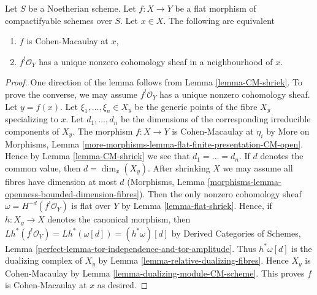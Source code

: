 \begin{lemma}
\label{lemma-affine-flat-Noetherian-CM}
Let $S$ be a Noetherian scheme. Let $f : X \to Y$ be a flat
morphism of compactifyable schemes over $S$. Let $x \in X$.
The following are equivalent
\begin{enumerate}
\item $f$ is Cohen-Macaulay at $x$,
\item $f^!\mathcal{O}_Y$ has a unique nonzero cohomology sheaf
in a neighbourhood of $x$.
\end{enumerate}
\end{lemma}

\begin{proof}
One direction of the lemma follows from Lemma \ref{lemma-CM-shriek}.
To prove the converse, we may assume $f^!\mathcal{O}_Y$ has a unique
nonzero cohomology sheaf. Let $y = f(x)$. Let $\xi_1, \ldots, \xi_n \in X_y$
be the generic points of the fibre $X_y$ specializing to $x$.
Let $d_1, \ldots, d_n$ be the dimensions of the corresponding
irreducible components of $X_y$. The morphism $f : X \to Y$ is Cohen-Macaulay
at $\eta_i$ by More on Morphisms, Lemma
\ref{more-morphisms-lemma-flat-finite-presentation-CM-open}.
Hence by Lemma \ref{lemma-CM-shriek} we see that
$d_1 = \ldots = d_n$. If $d$ denotes the common value, then $d = \dim_x(X_y)$.
After shrinking $X$ we may assume all fibres have dimension at most $d$
(Morphisms, Lemma \ref{morphisms-lemma-openness-bounded-dimension-fibres}).
Then the only nonzero cohomology sheaf $\omega = H^{-d}(f^!\mathcal{O}_Y)$
is flat over $Y$ by Lemma \ref{lemma-flat-shriek}.
Hence, if $h : X_y \to X$ denotes the canonical morphism, then
$Lh^*(f^!\mathcal{O}_Y) = Lh^*(\omega[d]) = (h^*\omega)[d]$
by Derived Categories of Schemes, Lemma
\ref{perfect-lemma-tor-independence-and-tor-amplitude}.
Thus $h^*\omega[d]$ is the dualizing complex of $X_y$ by
Lemma \ref{lemma-relative-dualizing-fibres}.
Hence $X_y$ is Cohen-Macaulay by
Lemma \ref{lemma-dualizing-module-CM-scheme}.
This proves $f$ is Cohen-Macaulay at $x$ as desired.
\end{proof}

